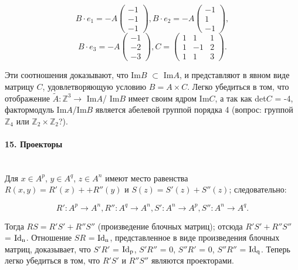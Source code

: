 {\begin{equation*}
B \cdot e_{1} = -A \begin{pmatrix} -1 \\ -1 \\ -1 \end{pmatrix}, B \cdot e_{2} = -A \begin{pmatrix} -1 \\ 1 \\ -1 \end{pmatrix},
\end{equation*}
\begin{equation*}
B \cdot e_{3} = -A \begin{pmatrix} -1 \\ -2 \\ -3 \end{pmatrix}, C = \begin{pmatrix} 1 & 1 & 1 \\ 1 & -1 & 2 \\ 1 & 1 & 3 \end{pmatrix}.
\end{equation*}

\noindent Эти соотношения доказывают, что Im{$B$} $\subset$ Im{$A$}, и представляют в явном виде матрицу $C$, удовлетворяющую условию $B = A \times C$. Легко убедиться в том, что отображение $\tilde{A} : \mathbb {Z}^3 \rightarrow$ Im{$A$}/ Im{$B$} имеет своим ядром Im{$C$}, а так как det{$C$} = -4, фактормодуль Im{$A$}/Im{$B$} является абелевой группой порядка 4 (вопрос: группой $\mathbb {Z}_{4}$ или $\mathbb {Z}_2 \times \mathbb {Z}_2$?).




\paragraph{15. Проекторы} \mbox{}\\

Для $x \in A^{p}$, $y \in A^{q}$, $z \in A^{n}$ имеют место равенства $R(x, y) = R'(x)+
+R''(y)$ и $S(z) = S'(z) + S''(z)$; следовательно:

\begin{equation*}
R' : A^{p} \rightarrow A^{n}, R'' : A^{q} \rightarrow A^{n}, S' : A^{n} \rightarrow A^{p}, S'' : A^{n} \rightarrow A^{q}.
\end{equation*}

\noindent Тогда $RS = R'S' + R''S''$ (произведение блочных матриц); отсюда
$R'S' + R''S''$ = $\rm{Id}_{n}$. Отношение $SR$ = $\rm{Id}_{n}$, представленное в виде произведения блочных матриц, доказывает, что $S'R'$ = $\rm{Id}_{p}$, $S'R''$ = 0,
$S''R'$ = 0, $S''R''$ = $\rm{Id}_{q}$. Теперь легко убедиться в том, что $R'S'$ и $R''S''$
являются проекторами.

}
